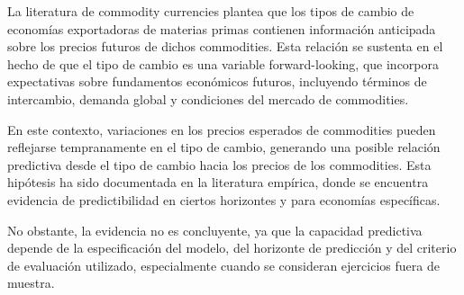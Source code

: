 \documentclass[11pt,a4paper]{article}
\begin{document}
	La literatura de commodity currencies plantea que los tipos de cambio de economías exportadoras de materias primas contienen información anticipada sobre los precios futuros de dichos commodities. Esta relación se sustenta en el hecho de que el tipo de cambio es una variable forward-looking, que incorpora expectativas sobre fundamentos económicos futuros, incluyendo términos de intercambio, demanda global y condiciones del mercado de commodities.
	
	En este contexto, variaciones en los precios esperados de commodities pueden reflejarse tempranamente en el tipo de cambio, generando una posible relación predictiva desde el tipo de cambio hacia los precios de los commodities. Esta hipótesis ha sido documentada en la literatura empírica, donde se encuentra evidencia de predictibilidad en ciertos horizontes y para economías específicas.
	
	No obstante, la evidencia no es concluyente, ya que la capacidad predictiva depende de la especificación del modelo, del horizonte de predicción y del criterio de evaluación utilizado, especialmente cuando se consideran ejercicios fuera de muestra.

	
\end{document}
